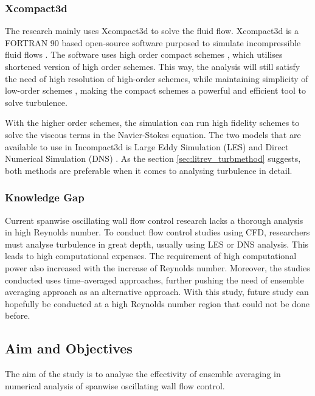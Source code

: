 \subsubsection{Xcompact3d}
\label{sec:litrev_ic3d}
The research mainly uses Xcompact3d to solve the fluid flow. Xcompact3d is a FORTRAN 90 based open-source software purposed to simulate incompressible fluid flows \cite{Bartholomew2020}. The software uses high order compact schemes \cite{Laizet2014}, which utilises shortened version of high order schemes. This way, the analysis will still satisfy the need of high resolution of high-order schemes, while maintaining simplicity of low-order schemes \cite{Laizet2009}, making the compact schemes a powerful and efficient tool to solve turbulence.


With the higher order schemes, the simulation can run high fidelity schemes to solve the viscous terms in the Navier-Stokes equation. The two models that are available to use in Incompact3d is Large Eddy Simulation (LES) and Direct Numerical Simulation (DNS) \cite{Laizet2014}. As the section \ref{sec:litrev_turbmethod} suggests, both methods are preferable when it comes to analysing turbulence in detail.



\subsubsection{Knowledge Gap}
\label{sec:litrev_knowgap}
Current spanwise oscillating wall flow control research lacks a thorough analysis in high Reynolds number. To conduct flow control studies using CFD, researchers must analyse turbulence in great depth, usually using LES or DNS analysis. This leads to high computational expenses. The requirement of high computational power also increased with the increase of Reynolds number. Moreover, the studies conducted uses time--averaged approaches, further pushing the need of ensemble averaging approach as an alternative approach. With this study, future study can hopefully be conducted at a high Reynolds number region that could not be done before.


\subsection{Aim and Objectives}
\label{sec:Aim and objectives}
The aim of the study is to analyse the effectivity of ensemble averaging in numerical analysis of spanwise oscillating wall flow control.

